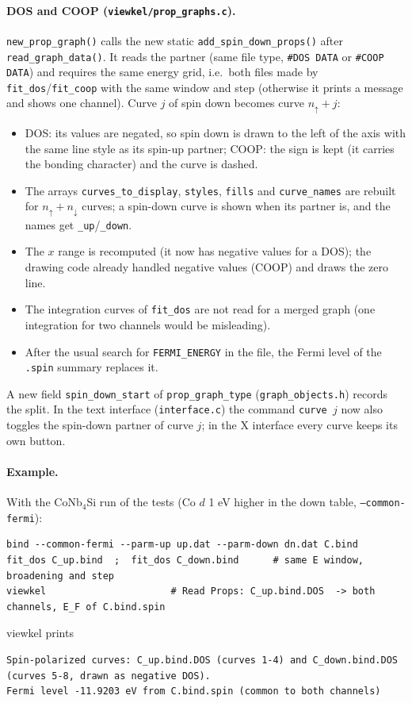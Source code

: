 \documentclass[11pt,a4paper]{article}
\newcommand{\file}[1]{\texttt{#1}}
\newcommand{\fn}[1]{\texttt{#1()}}
\newcommand{\var}[1]{\texttt{#1}}
\newcommand{\opt}[1]{\texttt{#1}}
\begin{document}
\paragraph{DOS and COOP (\file{viewkel/prop\_graphs.c}).} \fn{new\_prop\_graph} calls the
new static \fn{add\_spin\_down\_props} after \fn{read\_graph\_data}. It reads the partner
(same file type, \texttt{\#DOS DATA} or \texttt{\#COOP DATA}) and requires the same energy
grid, i.e.\ both files made by \file{fit\_dos}/\file{fit\_coop} with the same window and
step (otherwise it prints a message and shows one channel). Curve $j$ of spin down
becomes curve $n_\uparrow+j$:
\begin{itemize}
\item DOS: its values are negated, so spin down is drawn to the left of the axis with
  the same line style as its spin-up partner; COOP: the sign is kept (it carries the
  bonding character) and the curve is dashed.
\item The arrays \var{curves\_to\_display}, \var{styles}, \var{fills} and
  \var{curve\_names} are rebuilt for $n_\uparrow+n_\downarrow$ curves; a spin-down curve is
  shown when its partner is, and the names get \texttt{\_up}/\texttt{\_down}.
\item The $x$ range is recomputed (it now has negative values for a DOS); the drawing
  code already handled negative values (COOP) and draws the zero line.
\item The integration curves of \file{fit\_dos} are not read for a merged graph (one
  integration for two channels would be misleading).
\item After the usual search for \texttt{FERMI\_ENERGY} in the file, the Fermi level of
  the \texttt{.spin} summary replaces it.
\end{itemize}
A new field \var{spin\_down\_start} of \var{prop\_graph\_type} (\file{graph\_objects.h})
records the split. In the text interface (\file{interface.c}) the command
\texttt{curve $j$} now also toggles the spin-down partner of curve $j$; in the X
interface every curve keeps its own button.

\paragraph{Example.} With the CoNb$_4$Si run of the tests (Co $d$ 1 eV higher in the
down table, \opt{--common-fermi}):
\begin{lstlisting}[style=sh]
bind --common-fermi --parm-up up.dat --parm-down dn.dat C.bind
fit_dos C_up.bind  ;  fit_dos C_down.bind      # same E window, broadening and step
viewkel                      # Read Props: C_up.bind.DOS  -> both channels, E_F of C.bind.spin
\end{lstlisting}
viewkel prints
\begin{lstlisting}[style=sh]
Spin-polarized curves: C_up.bind.DOS (curves 1-4) and C_down.bind.DOS (curves 5-8, drawn as negative DOS).
Fermi level -11.9203 eV from C.bind.spin (common to both channels)
\end{lstlisting}
\end{document}
